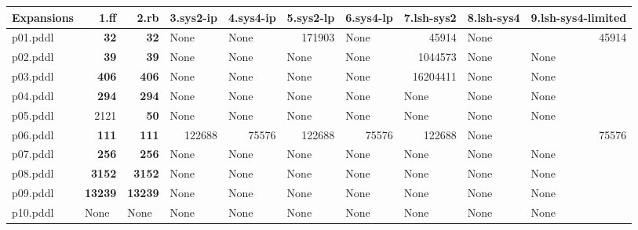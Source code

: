 \documentclass{article}
\begin{document}
\begin{tabular}{@{}lrrrrrrrrr@{}}
Expansions & 1.ff & 2.rb & 3.sys2-ip & 4.sys4-ip & 5.sys2-lp & 6.sys4-lp & 7.lsh-sys2 & 8.lsh-sys4 & 9.lsh-sys4-limited \\
\midrule
p01.pddl & \textbf{32} & \textbf{32} & \multicolumn{1}{|l|}{None} & \multicolumn{1}{|l|}{None} & 171903 & \multicolumn{1}{|l|}{None} & 45914 & \multicolumn{1}{|l|}{None} & 45914 \\
p02.pddl & \textbf{39} & \textbf{39} & \multicolumn{1}{|l|}{None} & \multicolumn{1}{|l|}{None} & \multicolumn{1}{|l|}{None} & \multicolumn{1}{|l|}{None} & 1044573 & \multicolumn{1}{|l|}{None} & \multicolumn{1}{|l|}{None} \\
p03.pddl & \textbf{406} & \textbf{406} & \multicolumn{1}{|l|}{None} & \multicolumn{1}{|l|}{None} & \multicolumn{1}{|l|}{None} & \multicolumn{1}{|l|}{None} & 16204411 & \multicolumn{1}{|l|}{None} & \multicolumn{1}{|l|}{None} \\
p04.pddl & \textbf{294} & \textbf{294} & \multicolumn{1}{|l|}{None} & \multicolumn{1}{|l|}{None} & \multicolumn{1}{|l|}{None} & \multicolumn{1}{|l|}{None} & \multicolumn{1}{|l|}{None} & \multicolumn{1}{|l|}{None} & \multicolumn{1}{|l|}{None} \\
p05.pddl & 2121 & \textbf{50} & \multicolumn{1}{|l|}{None} & \multicolumn{1}{|l|}{None} & \multicolumn{1}{|l|}{None} & \multicolumn{1}{|l|}{None} & \multicolumn{1}{|l|}{None} & \multicolumn{1}{|l|}{None} & \multicolumn{1}{|l|}{None} \\
p06.pddl & \textbf{111} & \textbf{111} & 122688 & 75576 & 122688 & 75576 & 122688 & \multicolumn{1}{|l|}{None} & 75576 \\
p07.pddl & \textbf{256} & \textbf{256} & \multicolumn{1}{|l|}{None} & \multicolumn{1}{|l|}{None} & \multicolumn{1}{|l|}{None} & \multicolumn{1}{|l|}{None} & \multicolumn{1}{|l|}{None} & \multicolumn{1}{|l|}{None} & \multicolumn{1}{|l|}{None} \\
p08.pddl & \textbf{3152} & \textbf{3152} & \multicolumn{1}{|l|}{None} & \multicolumn{1}{|l|}{None} & \multicolumn{1}{|l|}{None} & \multicolumn{1}{|l|}{None} & \multicolumn{1}{|l|}{None} & \multicolumn{1}{|l|}{None} & \multicolumn{1}{|l|}{None} \\
p09.pddl & \textbf{13239} & \textbf{13239} & \multicolumn{1}{|l|}{None} & \multicolumn{1}{|l|}{None} & \multicolumn{1}{|l|}{None} & \multicolumn{1}{|l|}{None} & \multicolumn{1}{|l|}{None} & \multicolumn{1}{|l|}{None} & \multicolumn{1}{|l|}{None} \\
p10.pddl & \multicolumn{1}{|l|}{None} & \multicolumn{1}{|l|}{None} & \multicolumn{1}{|l|}{None} & \multicolumn{1}{|l|}{None} & \multicolumn{1}{|l|}{None} & \multicolumn{1}{|l|}{None} & \multicolumn{1}{|l|}{None} & \multicolumn{1}{|l|}{None} & \multicolumn{1}{|l|}{None} \\

\end{tabular}
\end{document}
